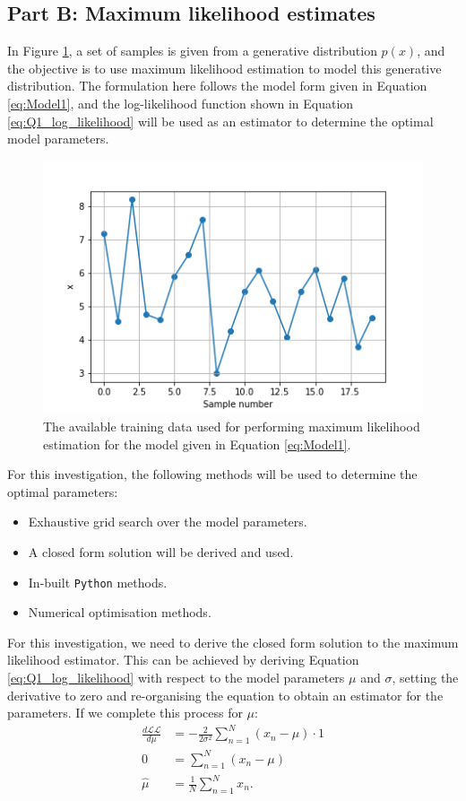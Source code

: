 \documentclass{article}
\begin{document}
 \subsection{Part B: Maximum likelihood estimates}
 
 In Figure \ref{fig:Q1b_1}, a set of samples is given from a generative distribution $p(x)$, and the objective is to use maximum likelihood estimation to model this generative distribution. The formulation here follows the model form given in Equation \eqref{eq:Model1}, and the log-likelihood function shown in Equation \eqref{eq:Q1_log_likelihood} will be used as an estimator to determine the optimal model parameters.
 \begin{figure}
     \centering
     \includegraphics[scale=0.5]{Q1b_fig1.png}
     \caption{The available training data used for performing maximum likelihood estimation for the model given in Equation \eqref{eq:Model1}.}
     \label{fig:Q1b_1}
 \end{figure}

For this investigation, the following methods will be used to determine the optimal parameters:
\begin{itemize}
    \item Exhaustive grid search over the model parameters.
    \item A closed form solution will be derived and used.
    \item In-built \texttt{Python} methods.
    \item Numerical optimisation methods.
\end{itemize}

For this investigation, we need to derive the closed form solution to the maximum likelihood estimator. This can be achieved by deriving Equation \eqref{eq:Q1_log_likelihood} with respect to the model parameters $\mu$ and $\sigma$, setting the derivative to zero and re-organising the equation to obtain an estimator for the parameters. If we complete this process for $\mu$: 
\begin{equation}
\begin{aligned}
\frac{d\mathcal{LL}}{d\mu} &= -\frac{2}{2\sigma^2} \sum_{n=1}^{N} \left(x_n - \mu\right) \cdot 1\\
0 &= \sum_{n=1}^{N}\left(x_n - \mu\right) \\
\hat{\mu} &= \frac{1}{N} \sum_{n=1}^{N} x_n.
\end{aligned}
\end{equation}
\end{document}
